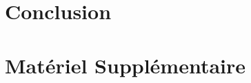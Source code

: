 \documentclass[titlepage,openright,letterpaper,12pt]{book}
\begin{document}
\chapter{Conclusion}



\singlespacing
\autoPageBlancheLivre

\appendix
\renewcommand\chapterstring{Annexe}
\chapter{Matériel Supplémentaire}



\end{document}
